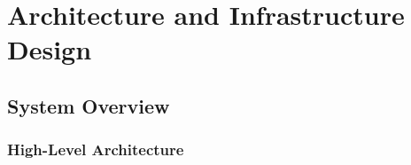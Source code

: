\documentclass[11pt, a4paper, twoside]{article}
\begin{document}

\section{Architecture and Infrastructure Design}
\label{sec:architecture}

\subsection{System Overview}

\subsubsection{High-Level Architecture}
\end{document}
